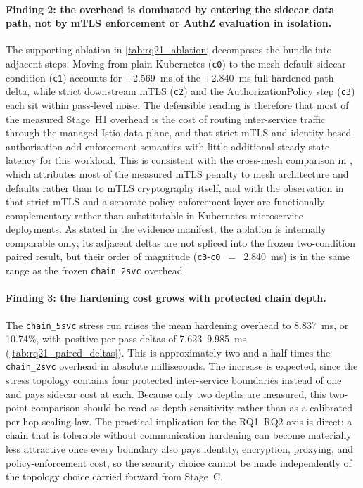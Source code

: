 \paragraph{Finding 2: the overhead is dominated by entering the sidecar data
path, not by mTLS enforcement or AuthZ evaluation in isolation.}
The supporting ablation in \cref{tab:rq21_ablation} decomposes the bundle
into adjacent steps. Moving from plain Kubernetes (\texttt{c0}) to the
mesh-default sidecar condition (\texttt{c1}) accounts for +2.569~ms of the
+2.840~ms full hardened-path delta, while strict downstream mTLS
(\texttt{c2}) and the AuthorizationPolicy step (\texttt{c3}) each sit within
pass-level noise. The defensible reading is therefore that most of the
measured Stage~H1 overhead is the cost of routing inter-service traffic
through the managed-Istio data plane, and that strict mTLS and identity-based
authorisation add enforcement semantics with little additional steady-state
latency for this workload. This is consistent with the cross-mesh comparison
in \cite{bremlerbarr2025mtls}, which attributes most of the measured mTLS
penalty to mesh architecture and defaults rather than to mTLS cryptography
itself, and with the observation in \cite{ashraf2025policy_workflow} that
strict mTLS and a separate policy-enforcement layer are functionally
complementary rather than substitutable in Kubernetes microservice
deployments. As stated in the evidence manifest, the ablation is internally
comparable only; its adjacent deltas are not spliced into the frozen
two-condition paired result, but their order of magnitude
(\texttt{c3}-\texttt{c0}~$=$~2.840~ms) is in the same range as the frozen
\texttt{chain\_2svc} overhead.

\paragraph{Finding 3: the hardening cost grows with protected chain depth.}
The \texttt{chain\_5svc} stress run raises the mean hardening overhead to
8.837~ms, or 10.74\%, with positive per-pass deltas of 7.623--9.985~ms
(\cref{tab:rq21_paired_deltas}). This is approximately two and a half times
the \texttt{chain\_2svc} overhead in absolute milliseconds. The increase is
expected, since the stress topology contains four protected inter-service
boundaries instead of one and pays sidecar cost at each. Because only two
depths are measured, this two-point comparison should be read as
depth-sensitivity rather than as a calibrated per-hop scaling law. The
practical implication for the RQ1--RQ2 axis is direct: a chain that is
tolerable without communication hardening can become materially less
attractive once every boundary also pays identity, encryption, proxying, and
policy-enforcement cost, so the security choice cannot be made independently
of the topology choice carried forward from Stage~C.


